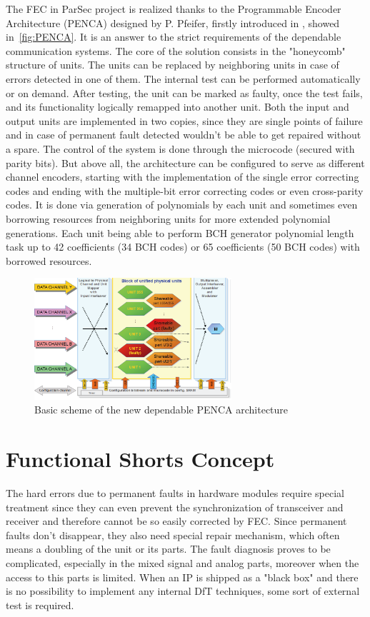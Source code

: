 The FEC in ParSec project is realized thanks to the Programmable Encoder Architecture (PENCA) designed by P. Pfeifer, firstly introduced in \cite{art:Pfeifer}, showed in~\autoref{fig:PENCA}. It is an answer to the strict requirements of the dependable communication systems. The core of the solution consists in the "honeycomb" structure of units. The units can be replaced by neighboring units in case of errors detected in one of them. The internal test can be performed automatically or on demand. After testing, the unit can be marked as faulty, once the test fails, and its functionality logically remapped into another unit. Both the input and output units are implemented in two copies, since they are single points of failure and in case of permanent fault detected wouldn't be able to get repaired without a spare. The control of the system is done through the microcode (secured with parity bits). But above all, the architecture can be configured to serve as different channel encoders, starting with the implementation of the single error correcting codes and ending with the multiple-bit error correcting codes or even cross-parity codes. It is done via generation of polynomials by each unit and sometimes even borrowing resources from neighboring units for more extended polynomial generations. Each unit being able to perform BCH generator polynomial length task up to 42 coefficients (34 BCH codes) or 65 coefficients (50 BCH codes) with borrowed resources.
 \begin{figure}[h]
 \centering
\includegraphics[width=0.65\textwidth]{figures/PENCA.png}
\caption{Basic scheme of the new dependable PENCA architecture~\cite{art:Pfeifer}}
\label{fig:PENCA}
\end{figure}

\section{Functional Shorts Concept}\label{sec:shorts}
The hard errors due to permanent faults in hardware modules require special treatment since they can even prevent the synchronization of transceiver and receiver and therefore cannot be so easily corrected by FEC. Since permanent faults don't disappear, they also need special repair mechanism, which often means a doubling of the unit or its parts. The fault diagnosis proves to be complicated, especially in the mixed signal and analog parts, moreover when the access to this parts is limited. When an IP is shipped as a "black box" and there is no possibility to implement any internal DfT techniques, some sort of external test is required. 

